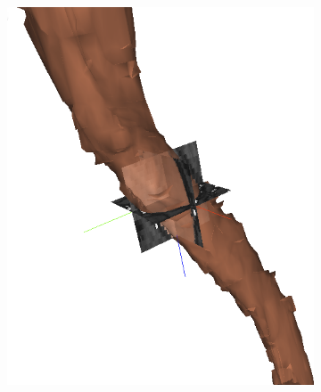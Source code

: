 \begin{figure}[htpb]
	\newcommand{\mywidth}{0.22\textwidth}
	\centering
	\hspace{3mm}
	\begin{subfigure}[b]{\mywidth}
		\centering
		\includegraphics[width=\textwidth]{data/images/interpolation/slice_edited.png}
		\caption{\label{fig:3dseg_slice}}
	\end{subfigure}
	\hspace{3mm}
	\begin{subfigure}[b]{\mywidth}
		\centering

\end{subfigure}
\end{figure}
